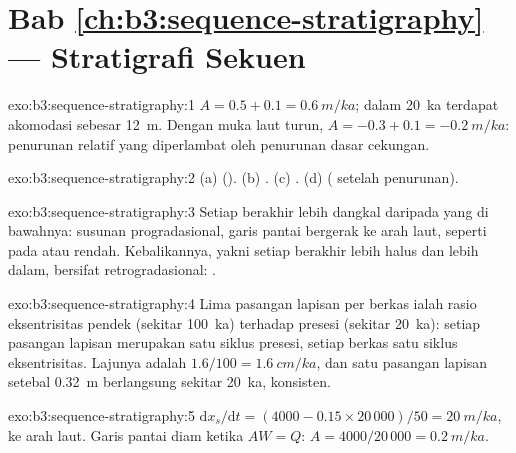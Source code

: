 \section*{Bab \ref{ch:b3:sequence-stratigraphy} --- Stratigrafi Sekuen}

\begin{solution}{exo:b3:sequence-stratigraphy:1}
$A = 0.5 + 0.1 = \qty{0.6}{m/ka}$; dalam \qty{20}{ka} terdapat akomodasi
sebesar \qty{12}{m}. Dengan muka laut turun, $A = -0.3 + 0.1 = \qty{-0.2}{m/ka}$:
penurunan relatif yang diperlambat oleh penurunan dasar cekungan.
\end{solution}

\begin{solution}{exo:b3:sequence-stratigraphy:2}
(a)  (). (b) . (c)
. (d)  ( setelah penurunan).
\end{solution}

\begin{solution}{exo:b3:sequence-stratigraphy:3}
Setiap  berakhir lebih dangkal daripada yang di bawahnya: susunan progradasional,
garis pantai bergerak ke arah laut, seperti pada  atau rendah. Kebalikannya,
yakni setiap  berakhir lebih halus dan lebih dalam, bersifat
retrogradasional: .
\end{solution}

\begin{solution}{exo:b3:sequence-stratigraphy:4}
Lima pasangan lapisan per berkas ialah rasio eksentrisitas pendek (sekitar
\qty{100}{ka}) terhadap presesi (sekitar \qty{20}{ka}): setiap pasangan lapisan
merupakan satu siklus presesi, setiap berkas satu siklus eksentrisitas. Lajunya
adalah $1.6/100 = \qty{1.6}{cm/ka}$, dan satu pasangan lapisan setebal \qty{0.32}{m} berlangsung sekitar
\qty{20}{ka}, konsisten.
\end{solution}

\begin{solution}{exo:b3:sequence-stratigraphy:5}
$\mathrm dx_s/\mathrm dt = (4000 - 0.15\times20\,000)/50 = \qty{20}{m/ka}$,
ke arah laut. Garis pantai diam ketika $AW = Q$: $A = 4000/20\,000 =
\qty{0.2}{m/ka}$.
\end{solution}

